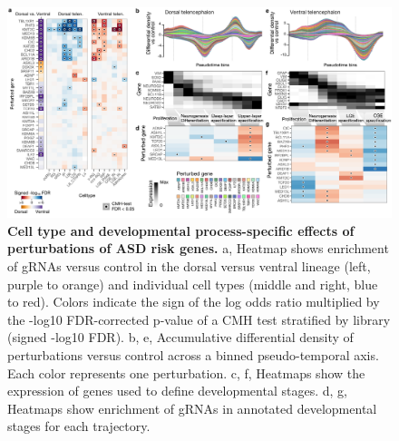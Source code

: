 \begin{figure}[t!]
    \centering
	\includegraphics[width=\textwidth]{figures/asd/Figure_2}
    \caption{\textbf{Cell type and developmental process-specific effects of perturbations of ASD risk genes.}
    a, Heatmap shows enrichment of gRNAs versus control in the dorsal versus ventral lineage (left, purple to orange) and individual cell types (middle and right, blue to red). Colors indicate the sign of the log odds ratio multiplied by the -log10 FDR-corrected p-value of a CMH test stratified by library (signed -log10 FDR). b, e, Accumulative differential density of perturbations versus control across a binned pseudo-temporal axis. Each color represents one perturbation. c, f, Heatmaps show the expression of genes used to define developmental stages. d, g, Heatmaps show enrichment of gRNAs in annotated developmental stages for each trajectory.}
    \label{fig:asd2}
\end{figure}

